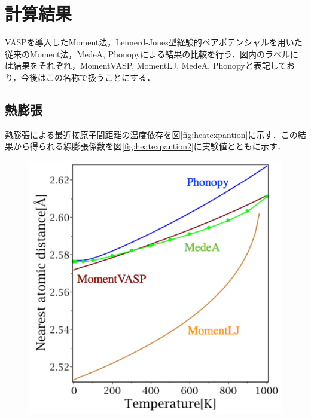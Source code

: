 \chapter{計算結果}
VASPを導入したMoment法，Lennerd-Jones型経験的ペアポテンシャルを用いた従来のMoment法，MedeA, Phonopyによる結果の比較を行う．図内のラベルには結果をそれぞれ，MomentVASP, MomentLJ, MedeA, Phonopyと表記しており，今後はこの名称で扱うことにする．
\section{熱膨張}
熱膨張による最近接原子間距離の温度依存を図\ref{fig:heatexpantion}に示す．この結果から得られる線膨張係数を図\ref{fig:heatexpantion2}に実験値とともに示す．

\begin{figure}[htbp]
 \begin{minipage}[b]{0.5\linewidth}
  \centering
  \includegraphics[keepaspectratio, scale=0.42]
  {../image_result/Cu_lat_label.eps}
  \label{he1}
 \end{minipage}
 \begin{minipage}[b]{0.5\linewidth}
  \centering

\end{minipage}
\end{figure}
